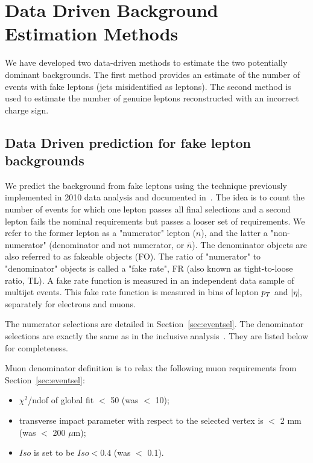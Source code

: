 \section{Data Driven Background Estimation Methods}
\label{sec:datadriven}

We have developed two data-driven methods to 
estimate the two potentially dominant backgrounds.
The first method provides an estimate of the number of events with fake leptons (jets misidentified as leptons).
The second method is used to estimate the number of genuine leptons reconstructed with an incorrect charge sign.

\subsection{Data Driven prediction for fake lepton backgrounds}
\label{sec:fakes}

We predict the background from fake leptons using the technique previously implemented in 2010 data analysis
and documented in~\cite{frmethod}.
The idea is to count the number of events for which one lepton passes all final selections and a second lepton
fails the nominal requirements but passes a looser set of requirements. 
We refer to the former lepton as a "numerator" lepton ($n$),
and the latter a "non-numerator" (denominator and not numerator, or $\bar{n}$).
The denominator objects are also referred to as fakeable objects (FO).
The ratio of "numerator" to "denominator" objects is called a "fake rate",
 FR (also known as tight-to-loose ratio, TL).  
A fake rate function is measured in an independent data sample of multijet events.
This fake rate function is measured in bins of lepton $p_T$ and $|\eta |$,
separately for electrons and muons. 

The numerator selections are detailed in Section~\ref{sec:eventsel}. 
The denominator selections are exactly the same as in the inclusive analysis~\cite{ssnote2011}.
They are listed below for completeness.

Muon denominator definition is to relax the following muon requirements from
Section~\ref{sec:eventsel}:
\begin{itemize}
\item $\chi^2$/ndof of global fit $<$ 50 (was $<$ 10);
\item transverse impact parameter with respect to the selected vertex is
$<$ 2 mm (was $<$ 200 $\mu$m);
\item $Iso$ is set to be $Iso < 0.4$  (was $<$ 0.1).
\end{itemize}

